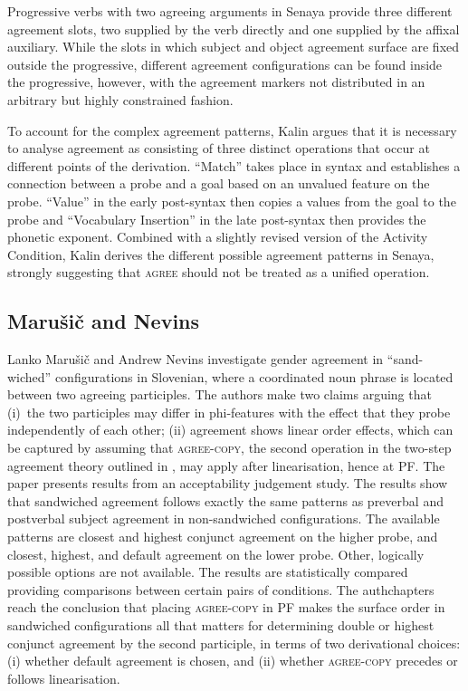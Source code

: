 \documentclass[output=paper
,modfonts
,nonflat]{langsci/langscibook}
\begin{document}
Progressive verbs with two agreeing arguments in Senaya provide three different agreement slots, two supplied by the verb directly and one supplied by the affixal auxiliary. While the slots in which subject and object agreement surface are fixed outside the progressive, different agreement configurations can be found inside the progressive, however, with the agreement markers not distributed in an arbitrary but highly constrained fashion.

To account for the complex agreement patterns, Kalin argues that it is necessary to analyse agreement as consisting of three distinct operations that occur at different points of the derivation. ``Match'' takes place in syntax and establishes a connection between a probe and a goal based on an unvalued feature on the probe. ``Value'' in the early post-syntax then copies a values from the goal to the probe and ``Vocabulary Insertion'' in the late post-syntax then provides the phonetic exponent. Combined with a slightly revised version of the Activity Condition, Kalin derives the different possible agreement patterns in Senaya, strongly suggesting that \textsc{agree} should not be treated as a unified operation.

\subsection{Maru\v{s}i\v{c} and Nevins}
\label{sec:mandn}

Lanko Marušič and Andrew Nevins investigate gender agreement in ``sand-\linebreak wiched'' configurations in Slovenian, where a coordinated noun phrase is located between two agreeing participles. The authors make two claims arguing that (i)~the two participles may differ in phi-features with the effect that they probe independently of each other; (ii) agreement shows linear order effects, which can be captured by assuming that \textsc{agree-copy}, the second operation in the two-step agreement theory outlined in \citet{arreginevins2012}, may apply after linearisation, hence at PF. The paper presents results from an acceptability judgement study. The results show that sandwiched agreement follows exactly the same patterns as preverbal and postverbal subject agreement in non-sandwiched configurations. The available patterns are closest and highest conjunct agreement on the higher probe, and closest, highest, and default agreement on the lower probe. Other, logically possible options are not available. The results are statistically compared providing comparisons between certain pairs of conditions. The authchapters reach the conclusion that placing \textsc{agree-copy} in PF makes the surface order in sandwiched configurations all that matters for determining double or highest conjunct agreement by the second participle, in terms of two derivational choices: (i) whether default agreement is chosen, and (ii) whether \textsc{agree-copy} precedes or follows linearisation.
\end{document}
